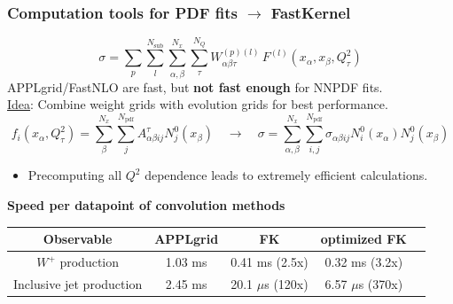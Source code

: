 \documentclass[10pt]{beamer}
\newcommand{\be}{\begin{equation*}}
\newcommand{\ee}{\end{equation*}}
\begin{document}
\begin{frame}
\frametitle{Computation tools for PDF fits $\to$ FastKernel}

\begin{equation}
\label{eq:applconv}
\sigma = \sum_p \sum_{l}^{N_{\mathrm{sub}}} \sum_{\alpha,\beta}^{N_x} \sum_{\tau}^{N_{Q}}
W_{\alpha\beta\tau}^{(p)(l)} \,
F^{(l)}\left(x_{\alpha}, x_{\beta},  Q^2_{\tau}\right)
\end{equation}
APPLgrid/FastNLO are fast, but \textbf{not fast enough} for NNPDF fits.\\
\underline{Idea}: Combine weight grids with evolution grids for best performance.
\be f_i(x_{\alpha},Q^2_\tau) =  \sum_\beta^{N_{x}} \sum_{j}^{N_{\mathrm{pdf}}} A^{\tau}_{\alpha\beta ij}N^0_j(x_{\beta} ) \quad \to \quad
 \sigma= \sum_{\alpha,\beta}^{N_x}\sum_{i,j}^{N_{\mathrm{pdf}}} \sigma_{\alpha\beta i j}N_i^0(x_\alpha)N_j^0(x_\beta)
\ee 
 \begin{itemize}
\item<1-> Precomputing all $Q^2$ dependence leads to extremely efficient calculations.
\end{itemize}

\begin{table}
\begin{center}
\textbf{Speed per datapoint of convolution methods}
\begin{tabular}{|c|c|c|c|c|}
\hline Observable &{\small\sc APPLgrid} & {\small\sc FK} & optimized  {\small\sc FK} \\
\hline $W^+$ production &1.03 ms & 0.41 ms (2.5x) & 0.32 ms (3.2x) \\
\hline Inclusive jet production &2.45 ms & 20.1 $\mu$s (120x) & 6.57 $\mu$s (370x) \\ 
\hline
\end{tabular}
\end{center}
\end{table}

\end{frame}
\end{document}
